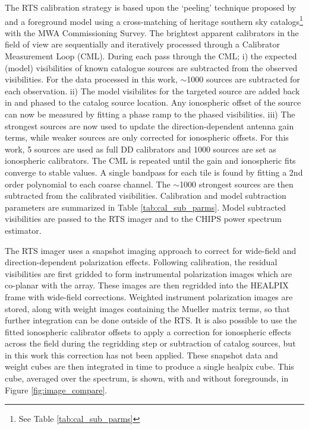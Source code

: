 \documentclass[twolcolumn,iop]{emulateapj}
\begin{document}
The RTS calibration strategy is based upon the `peeling' technique proposed by \cite{Noordam:2004p2379} and a foreground model using a cross-matching of heritage southern sky catalogs\footnote{See Table \ref{tab:cal_sub_parms}} with the MWA Commissioning Survey. The brightest apparent calibrators in the field of view are sequentially and iteratively processed through a Calibrator Measurement Loop (CML). During each pass through the CML; i) the expected (model) visibilities of known catalogue sources are subtracted from the observed visibilities. For the data processed in this work, $\sim$1000 sources are subtracted for each observation. ii) The model visibilites for the targeted source are added back in and phased to the catalog source location. Any ionospheric offset of the source can now be measured by fitting a phase ramp to the phased visibilities. iii) The strongest sources are now used to update the direction-dependent antenna gain terms, while weaker sources are only corrected for ionospheric offsets. For this work, 5 sources are used as full DD calibrators and 1000 sources are set as ionospheric calibrators. The CML is repeated until the gain and ionospheric fits converge to stable values. A single bandpass for each tile is found by fitting a 2nd order polynomial to each coarse channel. The $\sim$1000 strongest sources are then subtracted from the calibrated visibilities.   Calibration and model subtraction parameters are summarized in Table \ref{tab:cal_sub_parms}.  Model subtracted visibilities are passed to the RTS imager and to the CHIPS power spectrum estimator. %

The RTS imager uses a snapshot imaging approach to correct for wide-field and direction-dependent polarization effects. Following calibration, the residual visibilities are first gridded to form instrumental polarization images which are co-planar with the array. These images are then regridded into the HEALPIX \citep{Gorski:2005p7667} frame with wide-field corrections.  Weighted instrument polarization images are stored, along with weight images containing the Mueller matrix terms, so that further integration can be done outside of the RTS. It is also possible to use the fitted ionospheric calibrator offsets to apply a correction for ionospheric effects across the field during the regridding step or subtraction of catalog sources, but in this work this correction has not been applied. These snapshot data and weight cubes are then integrated in time to produce a single healpix cube. This cube, averaged over the spectrum, is shown, with and without foregrounds, in Figure \ref{fig:image_compare}.
\end{document}
